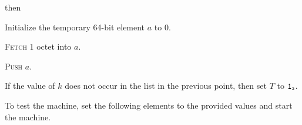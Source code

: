 \documentclass[a4paper,12pt]{article}
\newcommand{\num}[1]{\texttt{#1}}
\newcommand{\hex}[1]{\num{#1}_{\textup{\tiny 16}}}
\newcommand{\bin}[1]{\num{#1}_{\textup{\tiny 2}}}
\newcommand{\TERM}{T}
\newcommand{\T}{\bin{1}}
\newcommand{\proc}[1]{\textsc{#1}}
\newcommand{\op}[1]{$#1$}
\newcommand{\PUSHB}     [1]{\op{\hex{08}}}
\begin{document}
\begin{stepnumbers}
\begin{description}
\begin{stepnumbers}
    \end{stepnumbers}
  \item[\PUSHB{}] then
    \begin{stepnumbers}
    \item Initialize the temporary 64-bit element $a$ to 0.
    \item \proc{Fetch} 1 octet into $a$.
    \item \proc{Push} $a$.
    \end{stepnumbers}
  \end{description}
\item If the value of $k$ does not occur in the list in the previous point, then set $\TERM$ to $\T$.
\end{stepnumbers}

To test the machine, set the following elements to the provided values and start the machine.
\end{document}
